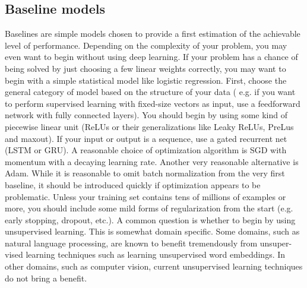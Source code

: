 \subsection{Baseline models}
Baselines are simple models chosen to provide a first estimation of the achievable level of performance. Depending on the complexity of your problem, you may even want to begin without using deep learning. If your problem has a chance of being solved by just choosing a few linear weights correctly, you may want to begin with a simple statistical model like logistic regression.\newline\newline
First, choose the general category of model based on the structure of your data ( e.g. if you want to perform supervised learning with fixed-size vectors as input, use a feedforward network with fully connected layers). You should begin by using some kind of piecewise linear
unit (ReLUs or their generalizations like Leaky ReLUs, PreLus and maxout). If your input or output is a sequence, use a gated recurrent net (LSTM or GRU).\newline\newline
A reasonable choice of optimization algorithm is SGD with momentum with a decaying learning rate. Another very reasonable alternative is Adam.\newline\newline
While it is reasonable to omit batch normalization from the very first baseline, it should be introduced quickly if optimization appears to be problematic.\newline\newline
Unless your training set contains tens of millions of examples or more, you should include some mild forms of regularization from the start (e.g. early stopping, dropout, etc.).\newline\newline
A common question is whether to begin by using unsupervised learning. This is somewhat domain specific. Some domains, such
as natural language processing, are known to benefit tremendously from unsuper- vised learning techniques such as learning unsupervised word embeddings. In other domains, such as computer vision, current unsupervised learning techniques do not bring a benefit.

